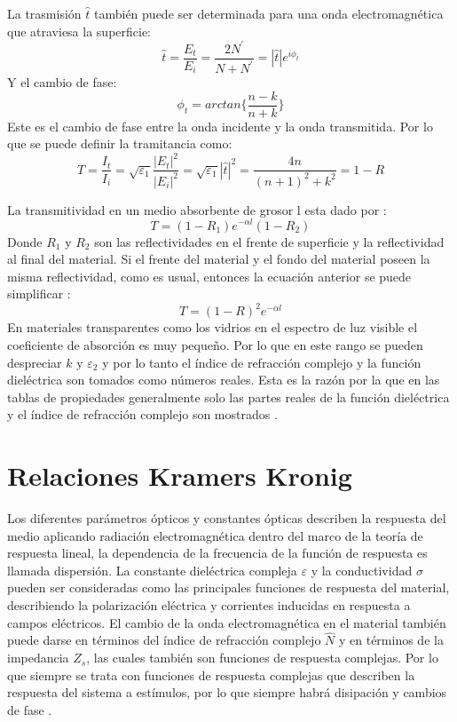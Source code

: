 \documentclass[a4paper,openright,12pt]{book}
\begin{document}
La trasmisión $\hat{t}$ también puede ser determinada para una onda electromagnética que atraviesa la  superficie:
\begin{equation}
\hat{t}=\frac{E_{t}}{E_{i}}=\frac{2N^{'}}{N+N^{'}}=|\hat{t}|e^{i\phi_{t}}
\end{equation}
Y el cambio de fase:
\begin{equation}
\phi_{t}=arctan\{\frac{n-k}{n+k}\}
\end{equation}
Este es el cambio de fase entre la onda incidente y la onda transmitida. Por lo que se puede definir la tramitancia como:
\begin{equation}
T=\frac{I_{t}}{I_{i}}=\sqrt{\varepsilon_{1}}\frac{|E_{t}|^{2}}{|E_{i}|^{2}}=\sqrt{\varepsilon_{1}}|\hat{t}|^{2}=\frac{4n}{(n+1)^{2}+k^{2}}=1-R
\end{equation}

La transmitividad en un medio absorbente de grosor l esta dado por \cite{MarkFox}:
\begin{equation}
T=(1-R_{1})e^{-\alpha l}(1-R_{2})
\end{equation}
Donde $R_{1}$ y $R_{2}$ son las reflectividades en el frente de superficie y la reflectividad al final del material. Si el frente del material y el fondo del material poseen la misma reflectividad, como es usual, entonces la ecuación anterior se puede simplificar \cite{MarkFox}:
\begin{equation}
T=(1-R)^{2}e^{-\alpha l}
\end{equation}
En materiales transparentes como los vidrios en el espectro de luz visible el coeficiente de absorción es muy pequeño. Por lo que en este rango se pueden despreciar $k$ y $\varepsilon_{2}$ y por lo tanto el índice de refracción complejo y la función dieléctrica son tomados como números reales. Esta es la razón por la que en las tablas de propiedades generalmente solo las partes reales de la función dieléctrica y el índice de refracción complejo son mostrados \cite{MarkFox}.

\section{Relaciones Kramers Kronig}
Los diferentes parámetros ópticos y constantes ópticas describen la respuesta del medio aplicando radiación electromagnética dentro del marco de la teoría de respuesta lineal, la dependencia de la frecuencia de la función de respuesta es llamada dispersión. La constante dieléctrica compleja $\varepsilon$ y la conductividad $\sigma$ pueden ser consideradas como las principales funciones de respuesta del material, describiendo la polarización eléctrica y corrientes inducidas en respuesta a campos eléctricos. El cambio de la onda electromagnética en el material también puede darse en términos del índice de refracción complejo $\hat{N}$ y en términos de la impedancia $Z_{s}$, las cuales también son funciones de respuesta complejas. Por lo que siempre se trata con funciones de respuesta complejas que describen la respuesta del sistema a estímulos, por lo que siempre habrá disipación y cambios de fase \cite{electrodynamics}. 
\end{document}
